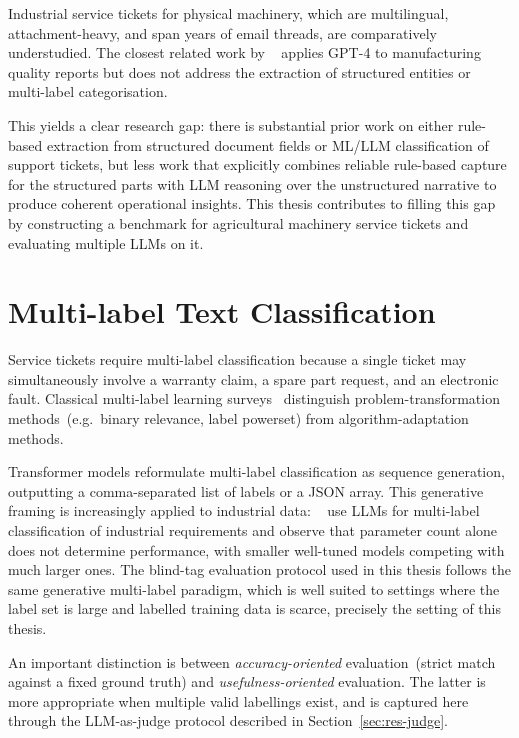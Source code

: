 Industrial service tickets for physical machinery, which are multilingual,
attachment-heavy, and span years of email threads, are comparatively
understudied.  The closest related work by
\citeauthor{hassan2023llm}~\cite{hassan2023llm}
applies GPT-4 to manufacturing quality reports but does not address the
extraction of structured entities or multi-label categorisation.

This yields a clear research gap: there is substantial prior work on either
rule-based extraction from structured document fields or ML/LLM classification
of support tickets, but less work that explicitly combines reliable rule-based
capture for the structured parts with LLM reasoning over the unstructured
narrative to produce coherent operational insights.  This thesis contributes to
filling this gap by constructing a benchmark for agricultural machinery service
tickets and evaluating multiple LLMs on it.

\section{Multi-label Text Classification}
\label{sec:rw-multilabel}
%
Service tickets require multi-label classification because a single ticket may
simultaneously involve a warranty claim, a spare part request, and an electronic
fault.  Classical multi-label learning surveys~\cite{zhang2014review} distinguish
problem-transformation methods~(e.g.\ binary relevance, label powerset) from
algorithm-adaptation methods.

Transformer models reformulate multi-label classification as sequence generation,
outputting a comma-separated list of labels or a JSON array.  This generative
framing is increasingly applied to industrial data: \citeauthor{llm4industrial2024}~%
\cite{llm4industrial2024} use LLMs for multi-label classification of industrial
requirements and observe that parameter count alone does not determine
performance, with smaller well-tuned models competing with much larger ones.
The blind-tag evaluation protocol used in this thesis follows the same
generative multi-label paradigm, which is well suited to settings where the
label set is large and labelled training data is scarce, precisely the setting
of this thesis.

An important distinction is between \emph{accuracy-oriented} evaluation~(strict
match against a fixed ground truth) and \emph{usefulness-oriented} evaluation.
The latter is more appropriate when multiple valid labellings exist, and is
captured here through the LLM-as-judge protocol described in
Section~\ref{sec:res-judge}.


